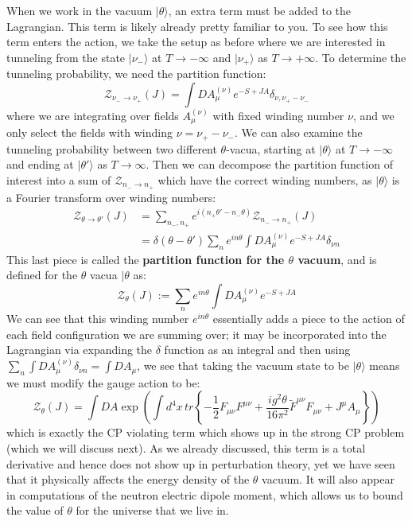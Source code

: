\documentclass[11pt, oneside]{article}   	%
\theoremstyle{definition}
\begin{document}
When we work in the vacuum $|\theta\rangle$, an extra term must be added to the Lagrangian. This term is likely already pretty familiar to 
you. To see how this term enters the action, we take the setup as before where we are interested in tunneling from the state 
$|\nu_-\rangle$ at $T \rightarrow-\infty$ and $|\nu_+\rangle$ as $T\rightarrow + \infty$. To determine the tunneling probability, we need the 
partition function:
\begin{equation}
	\mathcal Z_{\nu_-\rightarrow\nu_+}(J) = \int DA_\mu^{(\nu)} e^{-S + JA} \delta_{\nu, \nu_+ - \nu_-}
\end{equation}
where we are integrating over fields $A_\mu^{(\nu)}$ with fixed winding number $\nu$, and we only select the fields with winding 
$\nu = \nu_+ - \nu_-$. We can also examine the tunneling probability between two different $\theta$-vacua, starting at $|\theta\rangle$
at $T\rightarrow-\infty$ and ending at $|\theta'\rangle$ as $T\rightarrow\infty$. Then we can decompose the partition function of interest 
into a sum of $\mathcal Z_{n_-\rightarrow n_+}$ which have the correct winding numbers, as $|\theta\rangle$ is a Fourier transform 
over winding numbers:
\begin{align}
	\mathcal{Z}_{\theta\rightarrow\theta'}(J) &= \sum_{n_-, n_+} e^{i(n_+\theta' - n_-\theta)}\mathcal{Z}_{n_-\rightarrow n_+}(J) \\
	&= \delta(\theta - \theta') \sum_n e^{in\theta} \int DA_\mu^{(\nu)} e^{-S + JA}\delta_{\nu n}
\end{align}
This last piece is called the \textbf{partition function for the $\theta$ vacuum}, and is defined for the $\theta$ vacua $|\theta$ as:
\begin{equation}
	\mathcal Z_{\theta}(J) := \sum_n e^{in\theta} \int D A_\mu^{(\nu)} e^{-S + JA}
\end{equation}
We can see that this winding number $e^{in\theta}$ essentially adds a piece to the action of each field configuration we are summing 
over; it may be incorporated into the Lagrangian via expanding the $\delta$ function as an integral and then using $\sum_n \int 
DA_\mu^{(\nu)} \delta_{\nu n} = \int DA_\mu$, we see that taking the vacuum state to be $|\theta\rangle$ means we must 
modify the gauge action to be:
\begin{equation}
	\mathcal Z_\theta(J) = \int DA \exp\left(\int d^4 x\, tr\left\{-\frac{1}{2} F_{\mu\nu} F^{\mu\nu} + \frac{ig^2\theta}{16\pi^2} \tilde F^{\mu\nu} 
	F_{\mu\nu} + J^\mu A_\mu\right\}\right)
\end{equation}
which is exactly the CP violating term which shows up in the strong CP problem (which we will discuss next). As we already 
discussed, this term is a total derivative and hence does not show up in perturbation theory, yet we have seen that it physically affects 
the energy density of the $\theta$ vacuum. It will also appear in computations of the neutron electric dipole moment, which allows us 
to bound the value of $\theta$ for the universe that we live in. 
\end{document}
